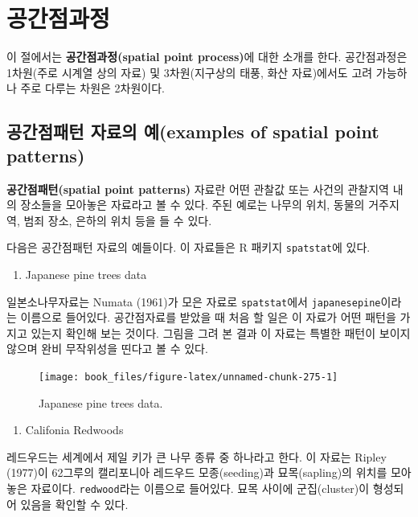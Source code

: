 \documentclass[b5paper,]{scrbook}
\providecommand{\tightlist}{%
  \setlength{\itemsep}{0pt}\setlength{\parskip}{0pt}}
\theoremstyle{plain}
\theoremstyle{definition}
\numberwithin{equation}{section}
\begin{document}
\chapter{공간점과정}\label{pointpattern}

이 절에서는 \textbf{공간점과정(spatial point process)}에 대한 소개를
한다. 공간점과정은 1차원(주로 시계열 상의 자료) 및 3차원(지구상의 태풍,
화산 자료)에서도 고려 가능하나 주로 다루는 차원은 2차원이다.

\section{공간점패턴 자료의 예(examples of spatial point
patterns)}\label{--examples-of-spatial-point-patterns}

\textbf{공간점패턴(spatial point patterns)} 자료란 어떤 관찰값 또는
사건의 관찰지역 내의 장소들을 모아놓은 자료라고 볼 수 있다. 주된 예로는
나무의 위치, 동물의 거주지역, 범죄 장소, 은하의 위치 등을 들 수 있다.

다음은 공간점패턴 자료의 예들이다. 이 자료들은 R 패키지
\texttt{spatstat}에 있다.

\begin{enumerate}
\def\labelenumi{\arabic{enumi}.}
\tightlist
\item
  Japanese pine trees data
\end{enumerate}

일본소나무자료는 Numata (1961)가 모은 자료로 \texttt{spatstat}에서
\texttt{japanesepine}이라는 이름으로 들어있다. 공간점자료를 받았을 때
처음 할 일은 이 자료가 어떤 패턴을 가지고 있는지 확인해 보는 것이다.
그림을 그려 본 결과 이 자료는 특별한 패턴이 보이지 않으며 완비
무작위성을 띤다고 볼 수 있다.

\begin{figure}

{\centering \texttt{[image: book\_files/figure-latex/unnamed-chunk-275-1]} 

}

\caption{Japanese pine trees data.}\label{fig:unnamed-chunk-275}
\end{figure}

\begin{enumerate}
\def\labelenumi{\arabic{enumi}.}
\setcounter{enumi}{1}
\tightlist
\item
  Califonia Redwoods
\end{enumerate}

레드우드는 세계에서 제일 키가 큰 나무 종류 중 하나라고 한다. 이 자료는
Ripley (1977)이 62그루의 캘리포니아 레드우드 모종(seeding)과
묘목(sapling)의 위치를 모아놓은 자료이다. \texttt{redwood}라는 이름으로
들어있다. 묘목 사이에 군집(cluster)이 형성되어 있음을 확인할 수 있다.
\end{document}
